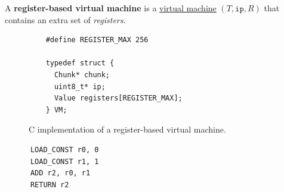   \begin{definition}
    \label{def:register-based-virtual-machine}
    A \textbf{register-based virtual machine} is a \hyperref[def:virtual-machine]{virtual machine} $(T, \texttt{ip}, R)$ that contains an extra set of \textit{registers}. 

    \begin{figure}[H]
      \centering 
      \begin{lstlisting}
	#define REGISTER_MAX 256

	typedef struct {
	  Chunk* chunk;
	  uint8_t* ip;
	  Value registers[REGISTER_MAX];
	} VM;
      \end{lstlisting}
      \caption{C implementation of a register-based virtual machine.} 
      \label{fig:register_based_vm}
    \end{figure}
  \end{definition}

  \begin{example}
    \label{ex:adding-2-numbers-2}
    \begin{lstlisting}
      LOAD_CONST r0, 0
      LOAD_CONST r1, 1
      ADD r2, r0, r1
      RETURN r2 
    \end{lstlisting}
  \end{example}
